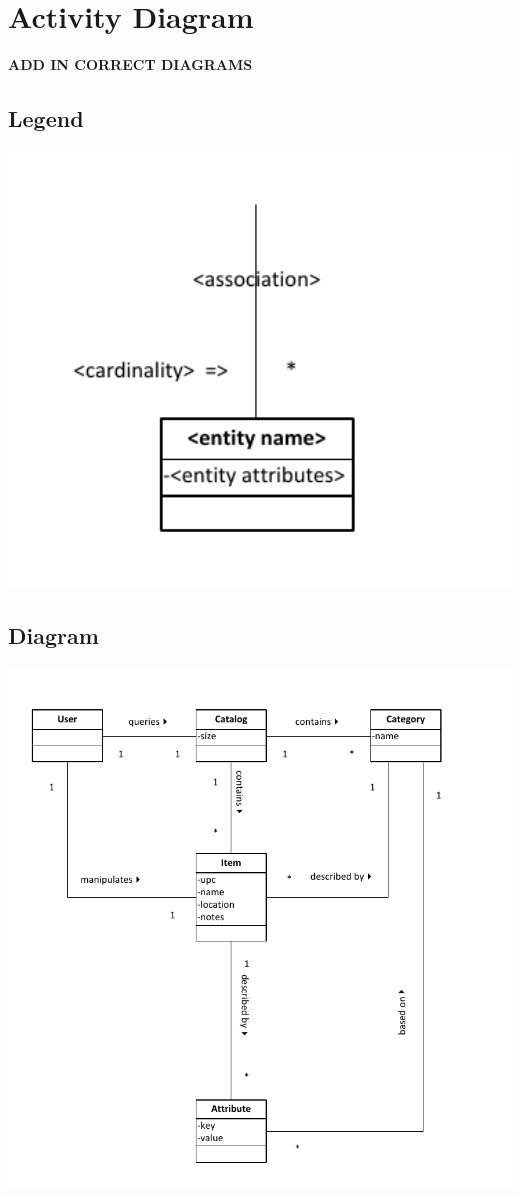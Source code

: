 \documentclass{article}
\begin{document}
\section{Activity Diagram}
\textbf{ADD IN CORRECT DIAGRAMS}
\subsection{Legend}
\includegraphics[keepaspectratio, width=6in]{domain_model_legend.pdf}\\
\subsection{Diagram}
\includegraphics[keepaspectratio, width=6in]{domain_model.pdf}\\
\end{document}
